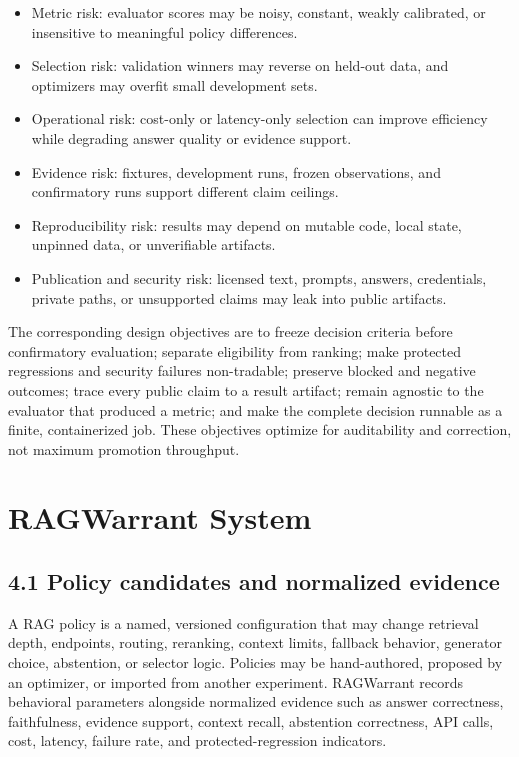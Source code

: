 \documentclass[11pt]{article}
\begin{document}
\begin{itemize}[leftmargin=*]
\item Metric risk: evaluator scores may be noisy, constant, weakly calibrated, or insensitive to meaningful policy differences.
\item Selection risk: validation winners may reverse on held-out data, and optimizers may overfit small development sets.
\item Operational risk: cost-only or latency-only selection can improve efficiency while degrading answer quality or evidence support.
\item Evidence risk: fixtures, development runs, frozen observations, and confirmatory runs support different claim ceilings.
\item Reproducibility risk: results may depend on mutable code, local state, unpinned data, or unverifiable artifacts.
\item Publication and security risk: licensed text, prompts, answers, credentials, private paths, or unsupported claims may leak into public artifacts.
\end{itemize}
The corresponding design objectives are to freeze decision criteria before confirmatory evaluation; separate eligibility from ranking; make protected regressions and security failures non-tradable; preserve blocked and negative outcomes; trace every public claim to a result artifact; remain agnostic to the evaluator that produced a metric; and make the complete decision runnable as a finite, containerized job. These objectives optimize for auditability and correction, not maximum promotion throughput.

\section{RAGWarrant System}
\subsection{4.1 Policy candidates and normalized evidence}
A RAG policy is a named, versioned configuration that may change retrieval depth, endpoints, routing, reranking, context limits, fallback behavior, generator choice, abstention, or selector logic. Policies may be hand-authored, proposed by an optimizer, or imported from another experiment. RAGWarrant records behavioral parameters alongside normalized evidence such as answer correctness, faithfulness, evidence support, context recall, abstention correctness, API calls, cost, latency, failure rate, and protected-regression indicators.
\end{document}
